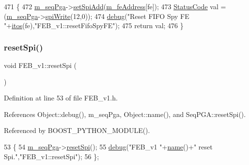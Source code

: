\begin{DoxyCode}
471                                        \{  
472   \hyperlink{classFEB__v1_a6c7804ac86796f233a8393043adf2e77}{m\_seqPga}->\hyperlink{classSeqPGA_ac998ce3a6d9b5f2e88cc8393f8c1df53}{setSpiAdd}(\hyperlink{classFEB__v1_a4e1945c2d5b434125f375e9d0fc6d99f}{m\_feAddress}[fe]);
473   \hyperlink{classStatusCode}{StatusCode} val = (\hyperlink{classFEB__v1_a6c7804ac86796f233a8393043adf2e77}{m\_seqPga}->\hyperlink{classSeqPGA_ad4421841ce4ce8b88ad13f63216f0743}{spiWrite}(12,0));
474   \hyperlink{classObject_aac010553f022165573714b7014a15f0d}{debug}(\textcolor{stringliteral}{"Reset FIFO Spy FE "}+\hyperlink{Tools_8h_af330027dbdafb9a30768b3613c553e60}{itos}(fe),\textcolor{stringliteral}{"FEB\_v1::resetFifoSpyFE"});
475   \textcolor{keywordflow}{return} val;
476 \}
\end{DoxyCode}
\mbox{\label{classFEB__v1_a1a50b5fff8a6e170fe136657f75b8ad4}} 
\subsubsection{\texorpdfstring{reset\+Spi()}{resetSpi()}}
{\footnotesize\ttfamily void F\+E\+B\+\_\+v1\+::reset\+Spi (\begin{DoxyParamCaption}{ }\end{DoxyParamCaption})\hspace{0.3cm}{\ttfamily [inline]}}



Definition at line 53 of file F\+E\+B\+\_\+v1.\+h.



References Object\+::debug(), m\+\_\+seq\+Pga, Object\+::name(), and Seq\+P\+G\+A\+::reset\+Spi().



Referenced by B\+O\+O\+S\+T\+\_\+\+P\+Y\+T\+H\+O\+N\+\_\+\+M\+O\+D\+U\+L\+E().


\begin{DoxyCode}
53                   \{
54     \hyperlink{classFEB__v1_a6c7804ac86796f233a8393043adf2e77}{m\_seqPga}->\hyperlink{classSeqPGA_a52f122a1767691eb950a4aae5981edfc}{resetSpi}();
55     \hyperlink{classObject_aac010553f022165573714b7014a15f0d}{debug}(\textcolor{stringliteral}{"FEB\_v1 "}+\hyperlink{classObject_a300f4c05dd468c7bb8b3c968868443c1}{name}()+\textcolor{stringliteral}{" reset Spi."},\textcolor{stringliteral}{"FEB\_v1::resetSpi"});
56   \};
\end{DoxyCode}
\mbox{\label{classFEB__v1_a8bf655504f9b0c51d5aa5bc6b30da00d}} 
